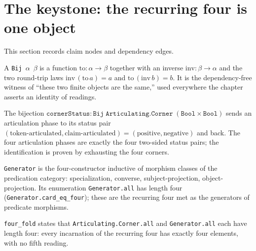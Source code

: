 \section{The keystone: the recurring four is one object}

This section records claim nodes and dependency edges.

\begin{proposition}\label{thm:bij}\leanok{}
A \texttt{Bij}~$\alpha$~$\beta$ is a function $\mathrm{to} : \alpha \to \beta$ together with an inverse $\mathrm{inv} : \beta \to \alpha$ and the two round-trip laws $\mathrm{inv}\,(\mathrm{to}\,a) = a$ and $\mathrm{to}\,(\mathrm{inv}\,b) = b$. It is the dependency-free witness of ``these two finite objects are the same,'' used everywhere the chapter asserts an identity of readings.
\end{proposition}
\begin{proposition}\label{thm:corner-status}\leanok{}
The bijection $\texttt{cornerStatus} : \texttt{Bij}\;\texttt{Articulating.Corner}\;(\texttt{Bool} \times \texttt{Bool})$ sends an articulation phase to its status pair $(\text{token-articulated}, \text{claim-articulated}) = (\text{positive}, \text{negative})$ and back. The four articulation phases are exactly the four two-sided status pairs; the identification is proven by exhausting the four corners.
\end{proposition}
\begin{proposition}\label{thm:generator}\leanok{}
\texttt{Generator} is the four-constructor inductive of morphism classes of the predication category: specialization, converse, subject-projection, object-projection. Its enumeration \texttt{Generator.all} has length four (\texttt{Generator.card\_eq\_four}); these are the recurring four met as the generators of predicate morphisms.
\end{proposition}
\begin{theorem}\label{thm:four-fold}\leanok{}
\texttt{four\_fold} states that \texttt{Articulating.Corner.all} and \texttt{Generator.all} each have length four: every incarnation of the recurring four has exactly four elements, with no fifth reading.
\end{theorem}
